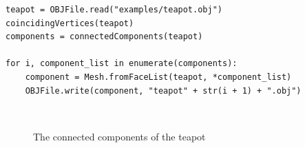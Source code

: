 \begin{ex}
\begin{lstlisting}
teapot = OBJFile.read("examples/teapot.obj")
coincidingVertices(teapot)
components = connectedComponents(teapot)

for i, component_list in enumerate(components):
    component = Mesh.fromFaceList(teapot, *component_list)
    OBJFile.write(component, "teapot" + str(i + 1) + ".obj")
    \end{lstlisting}
    \begin{figure}[ht]
    \centering
    \hfil
    \hfil\\
    \hfil
    \hfil
    \caption{The connected components of the teapot}
    \label{fig:einsteinex}
\end{figure}
\end{ex}
